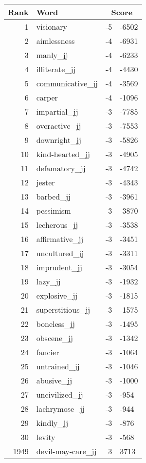 \begin{longtable}[!htbp]{| rlr@{.}l |}
    \hline
    \textbf{Rank} & \textbf{Word} & \multicolumn{2}{c|}{\textbf{Score}} \\
    \hline
    \endhead
    1 & visionary & -5 & -6502 \\
    2 & aimlessness & -4 & -6931 \\
    3 & manly\_jj & -4 & -6233 \\
    4 & illiterate\_jj & -4 & -4430 \\
    5 & communicative\_jj & -4 & -3569 \\
    6 & carper & -4 & -1096 \\
    7 & impartial\_jj & -3 & -7785 \\
    8 & overactive\_jj & -3 & -7553 \\
    9 & downright\_jj & -3 & -5826 \\
    10 & kind-hearted\_jj & -3 & -4905 \\
    11 & defamatory\_jj & -3 & -4742 \\
    12 & jester & -3 & -4343 \\
    13 & barbed\_jj & -3 & -3961 \\
    14 & pessimism & -3 & -3870 \\
    15 & lecherous\_jj & -3 & -3538 \\
    16 & affirmative\_jj & -3 & -3451 \\
    17 & uncultured\_jj & -3 & -3311 \\
    18 & imprudent\_jj & -3 & -3054 \\
    19 & lazy\_jj & -3 & -1932 \\
    20 & explosive\_jj & -3 & -1815 \\
    21 & superstitious\_jj & -3 & -1575 \\
    22 & boneless\_jj & -3 & -1495 \\
    23 & obscene\_jj & -3 & -1342 \\
    24 & fancier & -3 & -1064 \\
    25 & untrained\_jj & -3 & -1046 \\
    26 & abusive\_jj & -3 & -1000 \\
    27 & uncivilized\_jj & -3 & -954 \\
    28 & lachrymose\_jj & -3 & -944 \\
    29 & kindly\_jj & -3 & -876 \\
    30 & levity & -3 & -568 \\
    1949 & devil-may-care\_jj & 3 & 3713 \\

\end{longtable}
